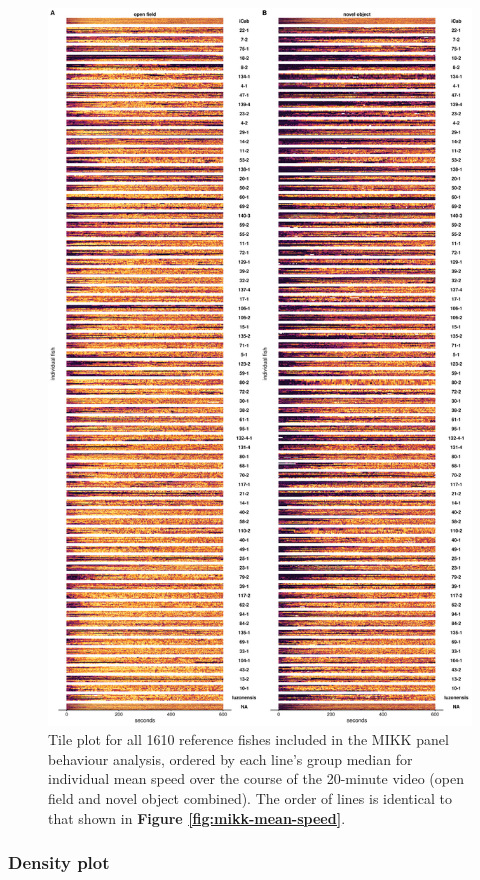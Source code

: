 \documentclass[
]{book}
\begin{document}
\begin{figure}
\includegraphics[width=1\linewidth]{figs/mikk_behaviour/0.08_15_tile_sge} \caption{Tile plot for all 1610 reference fishes included in the MIKK panel behaviour analysis, ordered by each line's group median for individual mean speed over the course of the 20-minute video (open field and novel object combined). The order of lines is identical to that shown in \textbf{Figure \ref{fig:mikk-mean-speed}}.}\label{fig:mikk-all-tile-sge}
\end{figure}

\hypertarget{density-plot-1}{%
\subsubsection{Density plot}\label{density-plot-1}}
\end{document}
